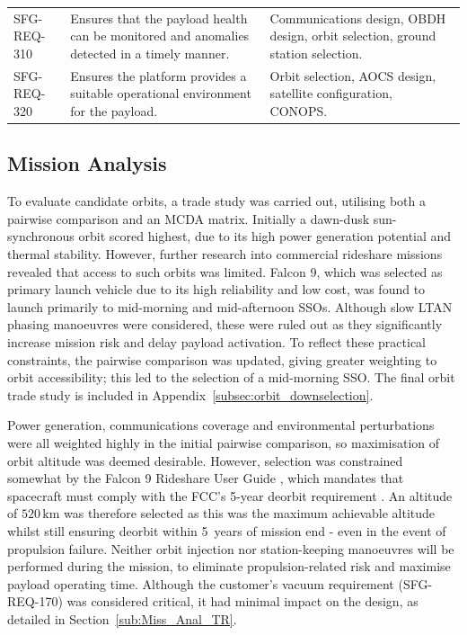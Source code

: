 \documentclass[a4paper, 11pt, conference]{IEEEtran}
\begin{document}
\begin{table}[H]
\begin{tabularx}{\linewidth}{l X|X}
SFG-REQ-310 &
Ensures that the payload health can be monitored and anomalies detected in a timely manner. 
& Communications design, OBDH design, orbit selection, ground station selection. \\

SFG-REQ-320 &
Ensures the platform provides a suitable operational environment for the payload.
& Orbit selection, AOCS design, satellite configuration, CONOPS. \\

\bottomrule
\end{tabularx}
\end{table}
\vspace{0pt}
\subsection{Mission Analysis}

To evaluate candidate orbits, a trade study was carried out, utilising both a pairwise comparison and an MCDA\label{nom:mcda} matrix. Initially a dawn-dusk sun-synchronous orbit scored highest, due to its high power generation potential and thermal stability. However, further research into commercial rideshare missions revealed that access to such orbits was limited. Falcon 9, which was selected as primary launch vehicle due to its high reliability and low cost, was found to launch primarily to mid-morning and mid-afternoon SSOs.  Although slow LTAN\label{nom:ltan} phasing manoeuvres were considered, these were ruled out as they significantly increase mission risk and delay payload activation. To reflect these practical constraints, the pairwise comparison was updated, giving greater weighting to orbit accessibility; this led to the selection of a mid-morning SSO. The final orbit trade study is included in Appendix~\ref{subsec:orbit_downselection}.

Power generation, communications coverage and environmental perturbations were all weighted highly in the initial pairwise comparison, so maximisation of orbit altitude was deemed desirable. However, selection was constrained somewhat by the Falcon 9 Rideshare User Guide \cite{noauthor_falcon9rideshare_2024}, which mandates that spacecraft must comply with the FCC's 5-year deorbit requirement \cite{noauthor_fcc_2022}. An altitude of $520\,\mathrm{km}$ was therefore selected as this was the maximum achievable altitude whilst still ensuring deorbit within 5~years of mission end - even in the event of propulsion failure. Neither orbit injection nor station-keeping manoeuvres will be performed during the mission, to eliminate propulsion-related risk and maximise payload operating time. Although the customer's vacuum requirement (SFG-REQ-170) was considered critical, it had minimal impact on the design, as detailed in Section~\ref{sub:Miss_Anal_TR}.
\end{document}
